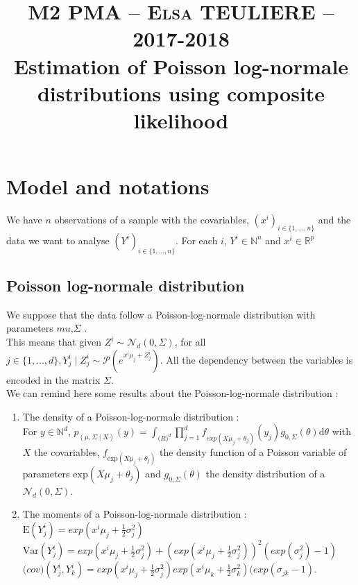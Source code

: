 \documentclass[11pt, a4paper]{article}
\title{	
\normalfont \normalsize 
\textsc{M2 PMA -- Elsa TEULIERE -- 2017-2018} \\ [25pt] %
\vspace{-0.8cm}
\horrule{0.5pt}  %
\textbf{Estimation of Poisson log-normale distributions using composite likelihood}
\vspace{-0.8cm}
\horrule{0.5pt}  %
}
\date{}
\author{}
\begin{document}
\maketitle
\vspace{1cm}

\section{Model and notations}
We have $n$ observations of a sample with the covariables, $(x^i)_{i \in \{1,...,n\}}$ and the data we want to analyse $(Y^i)_{i \in \{1,...,n\}}$. For each $i$, $Y^i \in \mathbb{N}^n$ and $x^i \in \mathbb{R}^p$

\subsection{Poisson log-normale distribution}
We suppose that the data follow a Poisson-log-normale distribution with parameters $mu$,$\Sigma$ \cite{aitchison1989multivariate}.\\
This means that given $Z^{i} \sim \mathcal{N}_{d}(0,\Sigma)$, for all $j \in \{1,...,d\}, Y^i_j \mid Z^i_j \sim \mathcal{P}(e^{x^i \mu_j + Z^i_j})$. All the dependency between the variables is encoded in the matrix $\Sigma$.\\
We can remind here some results about the Poisson-log-normale distribution :
\begin{enumerate}
\item The density of a Poisson-log-normale distribution :\\ For $y \in \mathbb{N}^d$, $p_{(\mu,\Sigma \mid X)}(y)=  \int_{\mathbb(R)^d} \prod_{j=1}^{d}f_{exp(X\mu_j+\theta_j)}(y_j)g_{0,\Sigma}(\theta)\mathrm{d}\theta$ with $X$ the covariables, $f_{\mathrm{exp}(X\mu_j+\theta_j)}$ the density function of a Poisson variable of parameters $\mathrm{exp}(X\mu_j+\theta_j)$  and $g_{0, \Sigma}(\theta)$ the density distribution of a $\mathcal{N}_d(0,\Sigma)$.
\item The moments of a Poisson-log-normale distribution : \\
$\mathrm{E}(Y^i_j)=exp(x^i\mu_j+\frac{1}{2}\sigma^2_j)$\\
$\mathrm{Var}(Y^i_j)=exp(x^i\mu_j+\frac{1}{2}\sigma^2_j)+(exp(x^i\mu_j+\frac{1}{2}\sigma^2_j))^2(exp(\sigma^2_j)-1)$\\
$\mathrm(cov)(Y^i_j,Y^i_k)=exp(x^i\mu_j+\frac{1}{2}\sigma^2_j)exp(x^i\mu_k+\frac{1}{2}\sigma^2_k)(exp(\sigma_{jk} - 1)$.
\end{enumerate}
\end{document}
